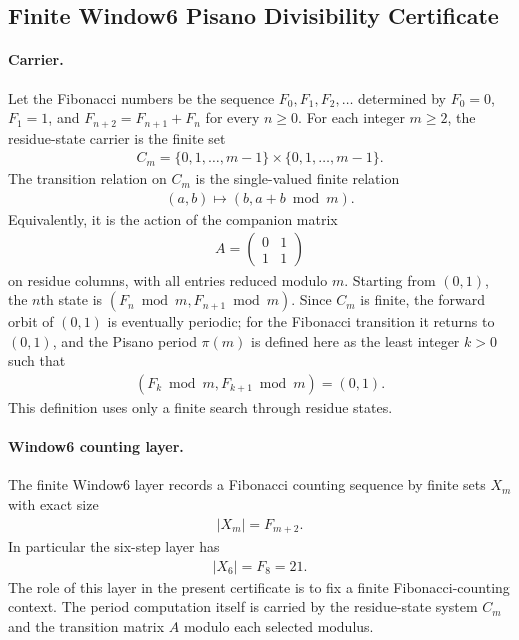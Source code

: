 
\subsection{Finite Window6 Pisano Divisibility Certificate}
\label{sec:window6-pisano-period-modp-divisibility-law}

\paragraph{Carrier.}
Let the Fibonacci numbers be the sequence $F_0,F_1,F_2,\ldots$ determined by $F_0=0$, $F_1=1$, and $F_{n+2}=F_{n+1}+F_n$ for every $n\geq 0$. For each integer $m\geq 2$, the residue-state carrier is the finite set
$$
\begin{aligned}
C_m=\{0,1,\ldots,m-1\}\times\{0,1,\ldots,m-1\}.
\end{aligned}
$$
The transition relation on $C_m$ is the single-valued finite relation
$$
\begin{aligned}
(a,b)\longmapsto (b,a+b \bmod m).
\end{aligned}
$$
Equivalently, it is the action of the companion matrix
$$
\begin{aligned}
A=\begin{pmatrix}0&1\\ 1&1\end{pmatrix}
\end{aligned}
$$
on residue columns, with all entries reduced modulo $m$. Starting from $(0,1)$, the $n$th state is $(F_n \bmod m,F_{n+1}\bmod m)$. Since $C_m$ is finite, the forward orbit of $(0,1)$ is eventually periodic; for the Fibonacci transition it returns to $(0,1)$, and the Pisano period $\pi(m)$ is defined here as the least integer $k>0$ such that
$$
\begin{aligned}
(F_k \bmod m,F_{k+1}\bmod m)=(0,1).
\end{aligned}
$$
This definition uses only a finite search through residue states.

\paragraph{Window6 counting layer.}
The finite Window6 layer records a Fibonacci counting sequence by finite sets $X_m$ with exact size
$$
\begin{aligned}
|X_m|=F_{m+2}.
\end{aligned}
$$
In particular the six-step layer has
$$
\begin{aligned}
|X_6|=F_8=21.
\end{aligned}
$$
The role of this layer in the present certificate is to fix a finite Fibonacci-counting context. The period computation itself is carried by the residue-state system $C_m$ and the transition matrix $A$ modulo each selected modulus.

